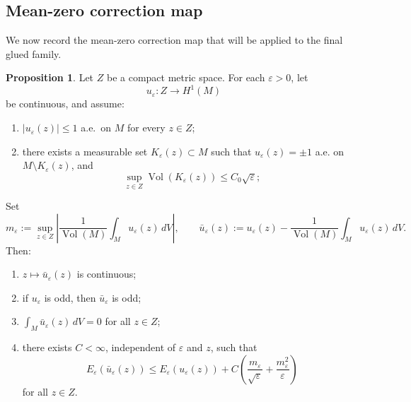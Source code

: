 \documentclass[12pt,english]{article}
\theoremstyle{definition}
\newtheorem{proposition}[theorem]{Proposition}
\begin{document}
\subsection{Mean-zero correction map}

We now record the mean-zero correction map that will be applied to the final glued family.

\begin{proposition}\label{prop:mean_zero_shift}
Let $Z$ be a compact metric space. For each $\varepsilon>0$, let
\[
u_\varepsilon:Z\to H^1(M)
\]
be continuous, and assume:
\begin{enumerate}
\item[(i)] $|u_\varepsilon(z)|\le 1$ a.e.\ on $M$ for every $z\in Z$;
\item[(ii)] there exists a measurable set $K_\varepsilon(z)\subset M$ such that $u_\varepsilon(z)=\pm 1$ a.e. on $M\setminus K_\varepsilon(z)$, and
\[
\sup_{z\in Z}\operatorname{Vol}(K_\varepsilon(z))\le C_0\sqrt{\varepsilon};
\]
\end{enumerate}
Set
\[
m_\varepsilon
:=
\sup_{z\in Z}
\left|
\frac{1}{\operatorname{Vol}(M)}\int_M u_\varepsilon(z)\,dV
\right|,
\qquad
\bar u_\varepsilon(z):=
u_\varepsilon(z)-\frac{1}{\operatorname{Vol}(M)}\int_M u_\varepsilon(z)\,dV.
\]
Then:
\begin{enumerate}
\item[(a)] $z\mapsto \bar u_\varepsilon(z)$ is continuous;
\item[(b)] if $u_\varepsilon$ is odd, then $\bar u_\varepsilon$ is odd;
\item[(c)] $\displaystyle \int_M \bar u_\varepsilon(z)\,dV=0$ for all $z\in Z$;
\item[(d)] there exists $C<\infty$, independent of $\varepsilon$ and $z$, such that
\[
E_\varepsilon(\bar u_\varepsilon(z))
\le
E_\varepsilon(u_\varepsilon(z))
+
C\left(\frac{m_\varepsilon}{\sqrt{\varepsilon}}+\frac{m_\varepsilon^2}{\varepsilon}\right)
\]
for all $z\in Z$.
\end{enumerate}
\end{proposition}
\end{document}

